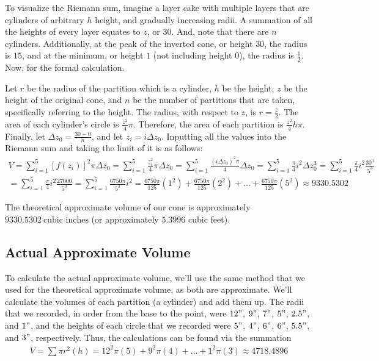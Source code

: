\documentclass[12pt]{article}
\begin{document}
To visualize the Riemann sum, imagine a layer cake with multiple layers that are
cylinders of arbitrary $h$ height, and gradually increasing radii. A  summation
of all the heights of every layer equates to $z$, or $30$. And, note that there
are $n$ cylinders. Additionally, at the peak of the inverted cone, or height
$30$, the radius is $15$, and at the minimum, or height $1$ (not including
height $0$), the radius is $\frac{1}{2}$. Now, for the formal calculation.

Let $r$ be the radius of the partition which is a cylinder, $h$ be the height,
$z$ be the height of the original cone, and $n$ be the number of partitions that
are taken, specifically referring to the height. The radius, with respect to
$z$, is $r = \frac{z}{2}$. The area of each cylinder's circle is
$\frac{z^{2}}{4}\pi$. Therefore, the area of each partition is
$\frac{z^{2}}{4}h\pi$. Finally, let $\Delta z_{0} = \frac{30 - 0}{n}$, and let
$z_{i} = i \Delta z_{0}$. Inputting all the values into the Riemann sum and
taking the limit of it is as follows:
\begin{gather*}
    V = \sum_{i=1}^{5} [f(z_{i})]^{2} \pi \Delta z_{0} 
    = \sum_{i=1}^{5} \frac{z_{i}^{2}}{4}\pi \Delta z_{0} 
    = \sum_{i=1}^{5} \frac{(i \Delta z_{0})^{2}\pi}{4} \Delta z_{0} 
    = \sum_{i=1}^{5} \frac{\pi}{4} i^{2} \Delta z_{0}^{3} 
    = \sum_{i=1}^{5} \frac{\pi}{4} i^{2} \frac{30^{3}}{5^{3}} \\
    = \sum_{i=1}^{5} \frac{\pi}{4} i^{2} \frac{27000}{5^{3}}
    = \sum_{i=1}^{5} \frac{6750\pi}{5^{3}} i^{2}
    = \frac{6750\pi}{125}(1^{2}) + \frac{6750\pi}{125}(2^{2}) + \dots + \frac{6750\pi}{125}(5^{2})
    \approx 9330.5302
\end{gather*}

The theoretical approximate volume of our cone is approximately
$\boxed{9330.5302 \ \text{cubic inches}}$ (or approximately $5.3996$ cubic
feet).

\subsection{Actual Approximate Volume}

To calculate the actual approximate volume, we'll use the same method that we
used for the theoretical approximate volume, as both are approximate. We'll
calculate the volumes of each partition (a cylinder) and add them up. The radii
that we recorded, in order from the base to the point, were $12"$, $9"$, $7"$,
$5"$, $2.5"$, and $1"$, and the heights of each circle that we recorded were
$5"$, $4"$, $6"$, $6"$, $5.5"$, and $3"$, respectively. Thus, the calculations
can be found via the summation
\begin{gather*}
    V = \sum \pi r^{2} (h) = 12^{2} \pi (5) + 9^{2} \pi (4) + \dots + 1^{2} \pi (3)
    \approx 4718.4896
\end{gather*}
\end{document}
